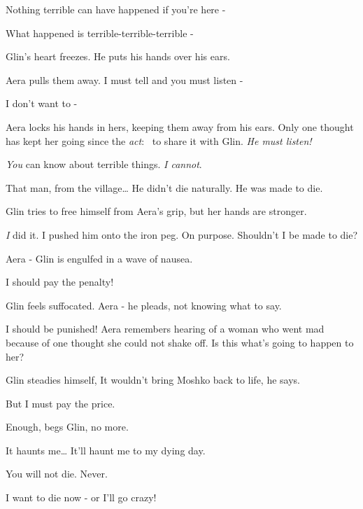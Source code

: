 \documentclass[12pt]{book}
\begin{document}
{\textquotedbl}Nothing terrible can have happened if you're here -{\textquotedbl}

{\textquotedbl}What happened is terrible-terrible-terrible -{\textquotedbl}

Glin's heart freezes. He puts his hands over his ears.

Aera pulls them away. {\textquotedbl}I must tell and you must listen -{\textquotedbl}

{\textquotedbl}I don't want to -{\textquotedbl}

Aera locks his hands in hers, keeping them away from his ears. Only one thought has kept her going since the
\textit{act}: \ to share it with Glin. \textit{He must listen! }

{\textquotedbl}\textit{You} can know about terrible things. \textit{I cannot}.{\textquotedbl}

{\textquotedbl}That man, from the village{\dots} He didn't die naturally. He was made to die.{\textquotedbl}

Glin tries to free himself from Aera's grip, but her hands are stronger.

{\textquotedbl}\textit{I} did it. I pushed him onto the iron peg. On purpose. Shouldn't I be made to die?{\textquotedbl}


{\textquotedbl}Aera -{\textquotedbl} Glin is engulfed in a wave of nausea.

{\textquotedbl}I should pay the penalty!{\textquotedbl}

Glin feels suffocated. {\textquotedbl}Aera -{\textquotedbl} he pleads, not knowing what to say.

{\textquotedbl}I should be punished!{\textquotedbl} Aera remembers hearing of a woman who went mad because of one
thought she could not shake off. Is this what's going to happen to her?

Glin steadies himself, {\textquotedbl}It wouldn't bring Moshko back to life,{\textquotedbl} he says.

{\textquotedbl}But I must pay the price.{\textquotedbl}

{\textquotedbl}Enough,{\textquotedbl} begs Glin, {\textquotedbl}no more.{\textquotedbl}

{\textquotedbl}It haunts me{\dots} It'll haunt me to my dying day.{\textquotedbl}

{\textquotedbl}You will not die. Never.{\textquotedbl}

{\textquotedbl}I want to die now - or I'll go crazy!{\textquotedbl}
\end{document}
